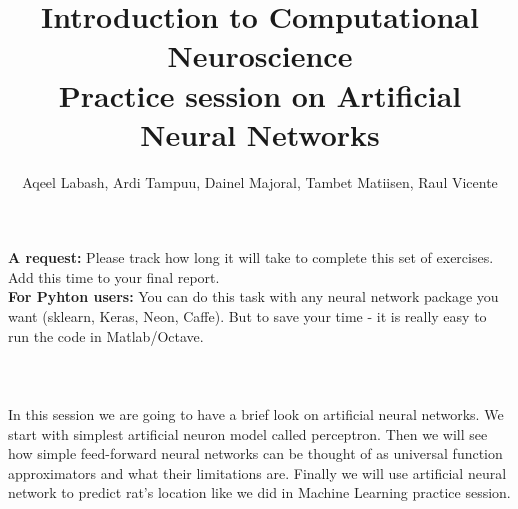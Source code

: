 \documentclass[a4paper,11pt]{article}
\author{\large{Aqeel Labash, Ardi Tampuu, Dainel Majoral, Tambet Matiisen, Raul Vicente}}
\title{\huge{Introduction to Computational Neuroscience}\\\LARGE{Practice session on Artificial Neural Networks}}
\begin{document}
\maketitle

\textbf{A request:} Please track how long it will take to complete this set of exercises. Add this time to your final report.
\ \\

\textbf{For Pyhton users:} You can do this task with any neural network package you want (sklearn, Keras, Neon, Caffe). But to save your time - it is really easy to run the code in Matlab/Octave.\\
\ \\
\ \\
\ \\
%
%
In this session we are going to have a brief look on artificial neural networks. We start with simplest artificial neuron model called perceptron. Then we will see how simple feed-forward neural networks can be thought of as universal function approximators and what their limitations are. Finally we will use artificial neural network to predict rat's location like we did in Machine Learning practice session.
\end{document}
